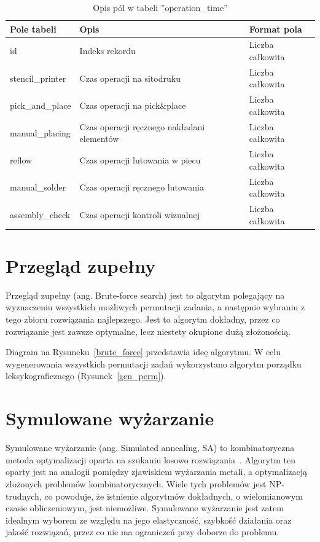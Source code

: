 \begin{table}[H]
	\centering
	\caption{Opis pól w tabeli ''operation\_time''}
	\begin{tabular}{lll}
		\toprule
		Pole tabeli      & Opis                                          & Format pola       \\
		\midrule
		id               & Indeks rekordu                                & Liczba całkowita \\
		stencil\_printer & Czas operacji na sitodruku                    & Liczba całkowita \\
		pick\_and\_place & Czas operacji na pick\&place                  & Liczba całkowita \\
		manual\_placing  & Czas operacji ręcznego nakładani elementów & Liczba całkowita \\
		reflow           & Czas operacji lutowania w piecu               & Liczba całkowita \\
		manual\_solder   & Czas operacji ręcznego lutowania             & Liczba całkowita \\
		assembly\_check  & Czas operacji kontroli wizualnej              & Liczba całkowita \\

		\bottomrule
	\end{tabular}
\end{table}

\newpage{}
\section{Przegląd zupełny}

Przegląd zupełny (ang. Brute-force search) jest to algorytm polegający na wyznaczeniu wszystkich możliwych permutacji zadania, a następnie wybraniu z tego zbioru rozwiązania najlepszego. Jest to algorytm dokładny, przez co rozwiązanie jest zawsze optymalne, lecz niestety okupione dużą złożonością.

Diagram na Rysuneku~\ref{brute_force} przedstawia ideę algorytmu. W celu wygenerowania wszystkich permutacji zadań wykorzystano algorytm porządku leksykograficznego (Rysunek~\ref{gen_perm}).

\section{Symulowane wyżarzanie}
Symulowane wyżarzanie (ang. Simulated annealing, SA) to kombinatoryczna metoda optymalizacji oparta na szukaniu losowo rozwiązania~\cite{sa}. Algorytm ten oparty jest na analogii pomiędzy zjawiskiem wyżarzania metali, a optymalizacją złożonych problemów kombinatorycznych. Wiele tych problemów jest NP-trudnych, co powoduje, że istnienie algorytmów dokładnych, o wielomianowym czasie obliczeniowym, jest niemożliwe. Symulowane wyżarzanie jest zatem idealnym wyborem ze względu na jego elastyczność, szybkość działania oraz jakość rozwiązań, przez co nie ma ograniczeń przy doborze do problemu.

